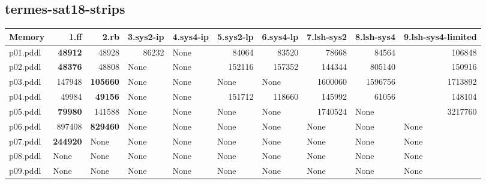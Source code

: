 \documentclass{article}
\begin{document}
\hypertarget{memory-termes-sat18-strips}{}
\subsection*{termes-sat18-strips}

\begin{tabular}{@{}lrrrrrrrrr@{}}
Memory & 1.ff & 2.rb & 3.sys2-ip & 4.sys4-ip & 5.sys2-lp & 6.sys4-lp & 7.lsh-sys2 & 8.lsh-sys4 & 9.lsh-sys4-limited \\
\midrule
p01.pddl & \textbf{48912} & 48928 & 86232 & \multicolumn{1}{|l|}{None} & 84064 & 83520 & 78668 & 84564 & 106848 \\
p02.pddl & \textbf{48376} & 48808 & \multicolumn{1}{|l|}{None} & \multicolumn{1}{|l|}{None} & 152116 & 157352 & 144344 & 805140 & 150916 \\
p03.pddl & 147948 & \textbf{105660} & \multicolumn{1}{|l|}{None} & \multicolumn{1}{|l|}{None} & \multicolumn{1}{|l|}{None} & \multicolumn{1}{|l|}{None} & 1600060 & 1596756 & 1713892 \\
p04.pddl & 49984 & \textbf{49156} & \multicolumn{1}{|l|}{None} & \multicolumn{1}{|l|}{None} & 151712 & 118660 & 145992 & 61056 & 148104 \\
p05.pddl & \textbf{79980} & 141588 & \multicolumn{1}{|l|}{None} & \multicolumn{1}{|l|}{None} & \multicolumn{1}{|l|}{None} & \multicolumn{1}{|l|}{None} & 1740524 & \multicolumn{1}{|l|}{None} & 3217760 \\
p06.pddl & 897408 & \textbf{829460} & \multicolumn{1}{|l|}{None} & \multicolumn{1}{|l|}{None} & \multicolumn{1}{|l|}{None} & \multicolumn{1}{|l|}{None} & \multicolumn{1}{|l|}{None} & \multicolumn{1}{|l|}{None} & \multicolumn{1}{|l|}{None} \\
p07.pddl & \textbf{244920} & \multicolumn{1}{|l|}{None} & \multicolumn{1}{|l|}{None} & \multicolumn{1}{|l|}{None} & \multicolumn{1}{|l|}{None} & \multicolumn{1}{|l|}{None} & \multicolumn{1}{|l|}{None} & \multicolumn{1}{|l|}{None} & \multicolumn{1}{|l|}{None} \\
p08.pddl & \multicolumn{1}{|l|}{None} & \multicolumn{1}{|l|}{None} & \multicolumn{1}{|l|}{None} & \multicolumn{1}{|l|}{None} & \multicolumn{1}{|l|}{None} & \multicolumn{1}{|l|}{None} & \multicolumn{1}{|l|}{None} & \multicolumn{1}{|l|}{None} & \multicolumn{1}{|l|}{None} \\
p09.pddl & \multicolumn{1}{|l|}{None} & \multicolumn{1}{|l|}{None} & \multicolumn{1}{|l|}{None} & \multicolumn{1}{|l|}{None} & \multicolumn{1}{|l|}{None} & \multicolumn{1}{|l|}{None} & \multicolumn{1}{|l|}{None} & \multicolumn{1}{|l|}{None} & \multicolumn{1}{|l|}{None} \\

\end{tabular}
\end{document}
